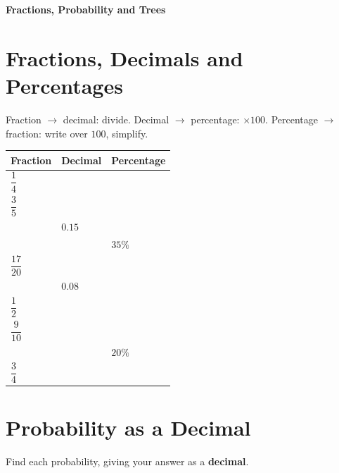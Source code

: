 \documentclass[11pt]{article}
\begin{document}
\thispagestyle{firstpage}

\begin{center}
  {\Large\bfseries Fractions, Probability and Trees}
\end{center}
\vspace{0.2em}

\begingroup\small

\section*{Fractions, Decimals and Percentages}
\noindent Fraction $\to$ decimal: divide. \quad Decimal $\to$ percentage: $\times 100$. \quad
Percentage $\to$ fraction: write over $100$, simplify.

\vspace{0.2em}
\begin{center}
\begin{tabular}{|Y|Y|Y|}
\hline
\textbf{Fraction} & \textbf{Decimal} & \textbf{Percentage} \\\hline
$\dfrac{1}{4}$ & & \\[0.5em]\hline
$\dfrac{3}{5}$ & & \\[0.5em]\hline
 & $0.15$ & \\[0.5em]\hline
 & & $35\%$ \\[0.5em]\hline
$\dfrac{17}{20}$ & & \\[0.5em]\hline
 & $0.08$ & \\[0.5em]\hline
$\dfrac{1}{2}$ & & \\[0.5em]\hline
$\dfrac{9}{10}$ & & \\[0.5em]\hline
 & & $20\%$ \\[0.5em]\hline
$\dfrac{3}{4}$ & & \\[0.5em]\hline
\end{tabular}
\end{center}

\vspace{0.4em}
\section*{Probability as a Decimal}
\noindent Find each probability, giving your answer as a \textbf{decimal}.
\end{document}

